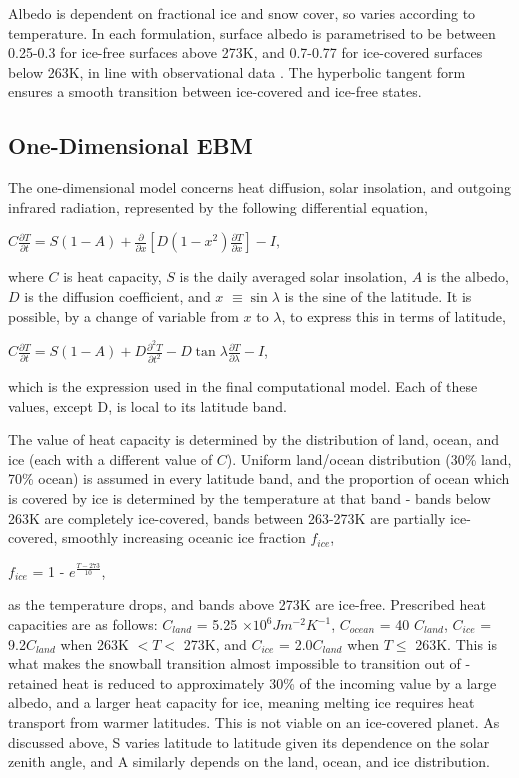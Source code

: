 \documentclass[12pt,onecolumn]{revtex4-2}    %
\begin{document}
Albedo is dependent on fractional ice and snow cover, so varies according to temperature. In each formulation, surface albedo is parametrised to be between 0.25-0.3 for ice-free surfaces above 273K, and 0.7-0.77 for ice-covered surfaces below 263K, in line with observational data \cite{GQ01} \cite{PP12}. The hyperbolic tangent form ensures a smooth transition between ice-covered and ice-free states.

\subsection{One-Dimensional EBM}
The one-dimensional model concerns heat diffusion, solar insolation, and outgoing infrared radiation, represented by the following differential equation,

\begin{center}
$C \frac{\partial T}{\partial t} = S(1-A) + \frac{\partial}{\partial x} [D(1-x^{2})\frac{\partial T}{\partial x}] - I, $
\end{center}

where $C$ is heat capacity, $S$ is the daily averaged solar insolation, $A$ is the albedo, $D$ is the diffusion coefficient, and $x$ $\equiv \sin\lambda$ is the sine of the latitude. It is possible, by a change of variable from $x$ to $\lambda$, to express this in terms of latitude,
\begin{center}
$C \frac{\partial T}{\partial t} = S(1-A) + D\frac{\partial^2 T}{\partial t^2} - D\tan\lambda\frac{\partial T}{\partial \lambda} - I$,
\end{center}
which is the expression used in the final computational model. Each of these values, except D, is local to its latitude band.
\

The value of heat capacity is determined by the distribution of land, ocean, and ice (each with a different value of $C$). Uniform land/ocean distribution (30\% land, 70\% ocean) is assumed in every latitude band, and the proportion of ocean which is covered by ice is determined by the temperature at that band - bands below 263K are completely ice-covered, bands between 263-273K are partially ice-covered, smoothly increasing oceanic ice fraction $f_{ice}$,

\begin{center}
$f_{ice}$ = 1 - $e^{\frac{T-273}{10}}$,
\end{center}

as the temperature drops, and bands above 273K are ice-free. Prescribed heat capacities are as follows: $C_{land}$ = 5.25 $\times 10^{6} Jm^{-2}K^{-1}$, $C_{ocean}$ = 40 $C_{land}$, $C_{ice}$ = 9.2$C_{land}$ when 263K $< T <$ 273K, and $C_{ice}$ = 2.0$C_{land}$ when $T \le$ 263K. This is what makes the snowball transition almost impossible to transition out of - retained heat is reduced to approximately 30\% of the incoming value by a large albedo, and a larger heat capacity for ice, meaning melting ice requires heat transport from warmer latitudes. This is not viable on an ice-covered planet. As discussed above, S varies latitude to latitude given its dependence on the solar zenith angle, and A similarly depends on the land, ocean, and ice distribution. 
\
\end{document}

